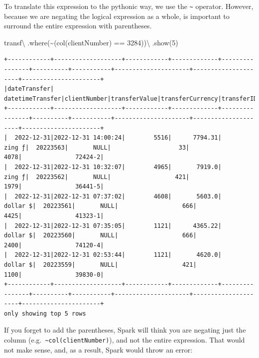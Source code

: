\documentclass[
  11pt,
  letterpaper,
  DIV=11,
  numbers=noendperiod]{scrreprt}
\newenvironment{Shaded}{\begin{snugshade}}{\end{snugshade}}
\newcommand{\DecValTok}[1]{\textcolor[rgb]{0.68,0.00,0.00}{#1}}
\newcommand{\NormalTok}[1]{\textcolor[rgb]{0.00,0.23,0.31}{#1}}
\newcommand{\OperatorTok}[1]{\textcolor[rgb]{0.37,0.37,0.37}{#1}}
\newcommand{\StringTok}[1]{\textcolor[rgb]{0.13,0.47,0.30}{#1}}
\begin{document}
To translate this expression to the pythonic way, we use the
\texttt{\textasciitilde{}} operator. However, because we are negating
the logical expression as a whole, is important to surround the entire
expression with parentheses.

\begin{Shaded}
\begin{Highlighting}[]
\NormalTok{transf}\OperatorTok{\textbackslash{}}
\NormalTok{  .where(}\OperatorTok{\textasciitilde{}}\NormalTok{(col(}\StringTok{\textquotesingle{}clientNumber\textquotesingle{}}\NormalTok{) }\OperatorTok{==} \DecValTok{3284}\NormalTok{))}\OperatorTok{\textbackslash{}}
\NormalTok{  .show(}\DecValTok{5}\NormalTok{)}
\end{Highlighting}
\end{Shaded}

\begin{verbatim}
+------------+-------------------+------------+-------------+----------------+----------+-----------+---------------------+---------------------+----------------------+
|dateTransfer|   datetimeTransfer|clientNumber|transferValue|transferCurrency|transferID|transferLog|destinationBankNumber|destinationBankBranch|destinationBankAccount|
+------------+-------------------+------------+-------------+----------------+----------+-----------+---------------------+---------------------+----------------------+
|  2022-12-31|2022-12-31 14:00:24|        5516|      7794.31|          zing ƒ|  20223563|       NULL|                   33|                 4078|               72424-2|
|  2022-12-31|2022-12-31 10:32:07|        4965|       7919.0|          zing ƒ|  20223562|       NULL|                  421|                 1979|               36441-5|
|  2022-12-31|2022-12-31 07:37:02|        4608|       5603.0|        dollar $|  20223561|       NULL|                  666|                 4425|               41323-1|
|  2022-12-31|2022-12-31 07:35:05|        1121|      4365.22|        dollar $|  20223560|       NULL|                  666|                 2400|               74120-4|
|  2022-12-31|2022-12-31 02:53:44|        1121|       4620.0|        dollar $|  20223559|       NULL|                  421|                 1100|               39830-0|
+------------+-------------------+------------+-------------+----------------+----------+-----------+---------------------+---------------------+----------------------+
only showing top 5 rows
\end{verbatim}

If you forget to add the parentheses, Spark will think you are negating
just the column
(e.g.~\texttt{\textasciitilde{}col(\textquotesingle{}clientNumber\textquotesingle{})}),
and not the entire expression. That would not make sense, and, as a
result, Spark would throw an error:
\end{document}
